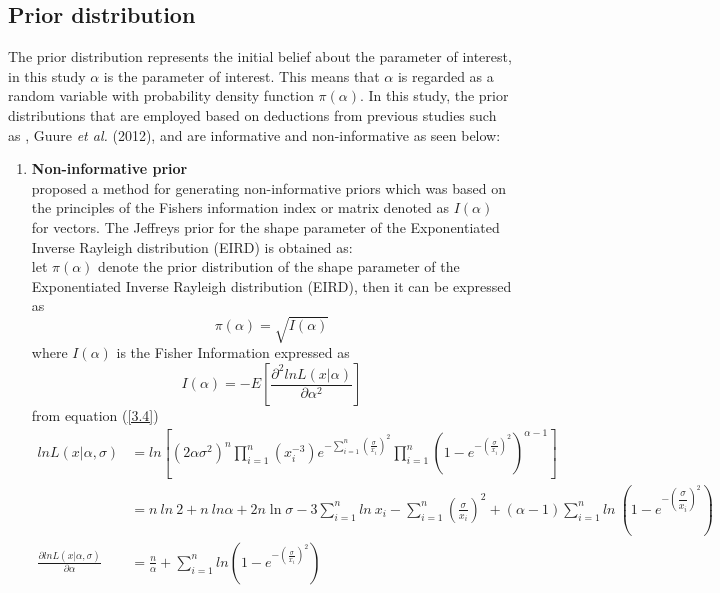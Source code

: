 \documentclass[a4paper,12pt]{report}
\newcommand{\para}{\hspace{0.5cm}}
\begin{document}
\subsection{Prior distribution}
\noindent\para The prior distribution represents the initial belief about the parameter of interest, in this study $\alpha$ is the parameter of interest. This means that $\alpha$ is regarded as a random variable with probability density function $\pi(\alpha)$. In this study, the prior distributions that are employed based on deductions from previous studies such as \cite{gupta2017bayesian}, Guure \textit{et al.} (2012), \cite{naji2019bayesian} and \cite{ieren2018comparison} are informative and non-informative as seen below:
\begin{enumerate}
\item \textbf{Non-informative prior}\\
\noindent\para \cite{jeffrey1946} proposed a method for generating non-informative priors which was based on the principles of the Fishers information index or matrix denoted as $I(\alpha)$ for vectors. The Jeffreys prior for the shape parameter of the Exponentiated Inverse Rayleigh distribution (EIRD) is obtained as:\\
let $\pi(\alpha)$ denote the prior distribution of the shape parameter of the Exponentiated Inverse Rayleigh distribution (EIRD), then it can be expressed as 
\begin{equation}\label{3.10} 
\pi(\alpha) = \sqrt{I(\alpha)}
\end{equation}
where  $I(\alpha)$ is the Fisher Information expressed as
\begin{equation}\label{3.11}
I(\alpha) = -E\left[\frac{\partial^2 ln L(x|\alpha)}{\partial \alpha^2}\right]
\end{equation}
from equation (\ref{3.4})
\[\begin{split}
lnL(x|\alpha,\sigma) &=ln\left[ (2\alpha\sigma^2)^n\prod\limits_{i=1}^{n}(x_i^{-3})e^{-\sum\limits_{ i=1 }^{n}(\frac{\sigma}{x_i})^2}\prod\limits_{i=1}^{n}\left(1-e^{-\left(\frac{\sigma}{x_i}\right)^2}\right)^{\alpha-1}\right]\\
&=n\ ln\ 2 + n\ ln\alpha+2n\ln\sigma-3\sum_{i=1}^{n}ln\ x_i -\sum_{i=1}^{n} \left(\frac{\sigma}{x_i}\right)^2+(\alpha-1)\sum_{i=1}^{n} ln\ \left(1-e^{-\left(\dfrac{\sigma}{x_i}\right)^2}\right)\\
\frac{\partial ln L(x|\alpha,\sigma)}{\partial \alpha} &=\frac{n}{\alpha}+\sum\limits_{i=1}^n ln\left(1-e^{-\left(\frac{\sigma}{x_i}\right)^2}\right)  \\

\end{split}\]
\end{enumerate}
\end{document}
